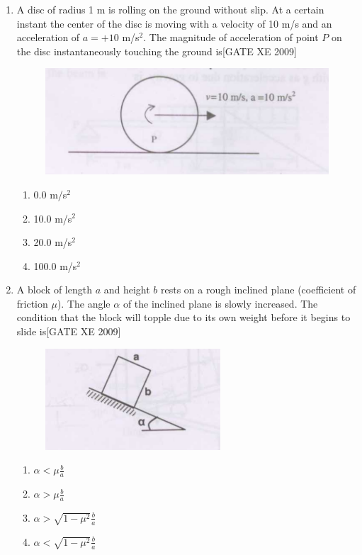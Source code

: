 \documentclass[journal,12pt,onecolumn]{IEEEtran}
\theoremstyle{remark}
\begin{document}
\begin{enumerate}
\item A disc of radius 1 m is rolling on the ground without slip. At a certain instant the center of the disc is moving with a velocity of 10 m/s and an acceleration of $a = + 10$ m/s$^2$. The magnitude of acceleration of point $P$ on the disc instantaneously touching the ground is\hfill[GATE XE 2009]

\begin{figure}[H]
    \centering
    \includegraphics[width=0.5\linewidth]{figs/fig10.png}
    \caption*{}
    \label{fig:Q 69}
\end{figure}


\begin{multicols}{2}
\begin{enumerate}
    \item 0.0 m/s$^2$
    \item 10.0 m/s$^2$
    \item 20.0 m/s$^2$
    \item 100.0 m/s$^2$
\end{enumerate}
\end{multicols}



\item A block of length $a$ and height $b$ rests on a rough inclined plane (coefficient of friction $\mu$). The angle $\alpha$ of the inclined plane is slowly increased. The condition that the block will topple due to its own weight before it begins to slide is\hfill[GATE XE 2009]

\begin{figure}[H]
    \centering
    \includegraphics[width=0.5\linewidth]{figs/fig11.png}
    \caption*{}
    \label{fig:70}
\end{figure}
\begin{multicols}{2}
\begin{enumerate}
    \item $\alpha < \mu \frac{b}{a}$
    \item $\alpha > \mu \frac{b}{a}$
    \item $\alpha > \sqrt{1-\mu^2} \frac{b}{a}$
    \item $\alpha < \sqrt{1-\mu^2} \frac{b}{a}$
\end{enumerate}
\end{multicols}





\end{enumerate}
\end{document}
